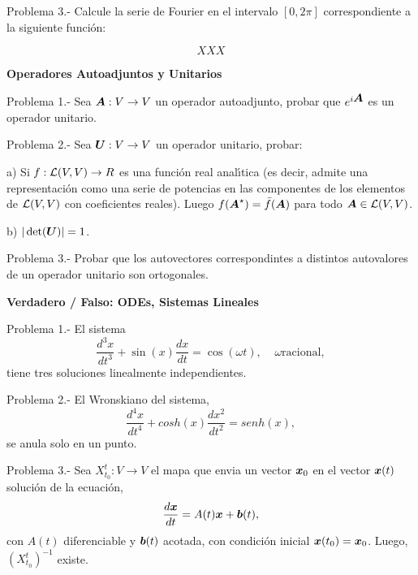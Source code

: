 \documentclass{article}
\newcommand{\ve}[1]{\mbox{\boldmath ${#1}$}}
\begin{document}
Problema 3.- Calcule la serie de Fourier en el intervalo $[0,2\pi]$ 
correspondiente a la siguiente funci\'on:

\begin{equation}
 XXX
\end{equation}


\newpage

\begin{center}
  \textbf{Operadores Autoadjuntos y Unitarios}
\end{center}

Problema 1.- Sea $\ve{A} : V \to V$ un operador autoadjunto, probar que
$e^{i\ve{A}}$ es un operador unitario.

Problema 2.- Sea $\ve{U} : V \to V$ un operador unitario, probar:

a) Si $f:{\cal{L}}(V,V) \to R$ es una funci\'on real anal\'\i{}tica
(es decir, admite una representaci\'on como una serie de potencias en las
componentes de los elementos de ${\cal{L}}(V,V)$ con coeficientes reales).
Luego $f(\ve{A}^{\star}) = \bar{f}(\ve{A})$ para todo 
$\ve{A} \in {\cal{L}}(V,V)$.

b) $|\det(\ve{U})| = 1$.

Problema 3.- Probar que los autovectores correspondintes a distintos autovalores de un operador unitario son ortogonales.


\vspace{1cm}


\begin{center}
  \textbf{Verdadero / Falso: ODEs, Sistemas Lineales}
\end{center}

Problema 1.- El sistema 
\begin{equation}
\frac{d^3x}{dt^3} + \sin(x)\frac{dx}{dt} = \cos(\omega t), \;\;\;\;
              \omega \mbox{racional},
\end{equation}
%
tiene tres soluciones linealmente independientes.

Problema 2.- El Wronskiano del sistema,
\begin{equation}
  \frac{d^4x}{dt^4} + cosh(x) \frac{dx^2}{dt^2} = senh(x),
\end{equation}
%
se anula solo en un punto.

Problema 3.- Sea $X^t_{t_0}: V \to V$ el mapa que envia un vector $\ve{x}_0$
en el vector $\ve{x}(t)$ soluci\'on de la ecuaci\'on,
\begin{equation}
  \frac{d\ve{x}}{dt} = A(t)\ve{x} + \ve{b}(t),
\end{equation}
con $A(t)$ diferenciable y $\ve{b}(t)$ acotada, con condici\'on inicial
$\ve{x}(t_0) = \ve{x}_0$.
Luego, $(X^t_{t_0})^{-1}$ existe.
\end{document}
